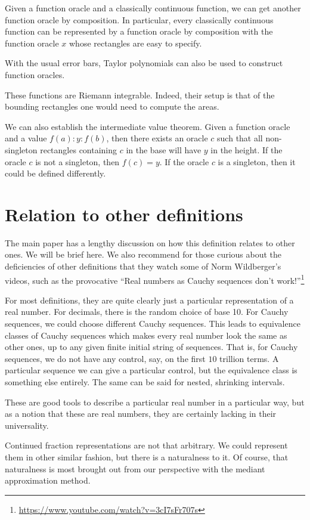 \documentclass[12pt]{article}
\theoremstyle{remark}
\begin{document}
Given a function oracle and a classically continuous function, we can get another function oracle by composition. In particular, every classically continuous function can be represented by a function oracle by composition with the function oracle $x$ whose rectangles are easy to specify. 

With the usual error bars, Taylor polynomials can also be used to construct function oracles. 

These functions are Riemann integrable. Indeed, their setup is that of the bounding rectangles one would need to compute the areas. 

We can also establish the intermediate value theorem. Given a function oracle and a value $f(a):y:f(b)$, then there exists an oracle $c$ such that all non-singleton rectangles containing $c$ in the base will have $y$ in the height. If the oracle $c$ is not a singleton, then $f(c) = y$. If the oracle $c$ is a singleton, then it could be defined differently. 

\section{Relation to other definitions}

The main paper has a lengthy discussion on how this definition relates to other ones. We will be brief here. We also recommend for those curious about the deficiencies of other definitions that they watch some of Norm Wildberger's videos, such as the provocative ``Real numbers as Cauchy sequences don't work!''\footnote{\url{https://www.youtube.com/watch?v=3cI7sFr707s}}

For most definitions, they are quite clearly just a particular representation of a real number. For decimals, there is the random choice of base 10. For Cauchy sequences, we could choose different Cauchy sequences. This leads to equivalence classes of Cauchy sequences which makes every real number look the same as other ones, up to any given finite initial string of sequences. That is, for Cauchy sequences, we do not have any control, say, on the first $10$ trillion terms. A particular sequence we can give a particular control, but the equivalence class is something else entirely. The same can be said for nested, shrinking intervals. 

These are good tools to describe a particular real number in a particular way, but as a notion that these are real numbers, they are certainly lacking in their universality. 

Continued fraction representations are not that arbitrary. We could represent them in other similar fashion, but there is a naturalness to it. Of course, that naturalness is most brought out from our perspective with the mediant approximation method.
\end{document}
